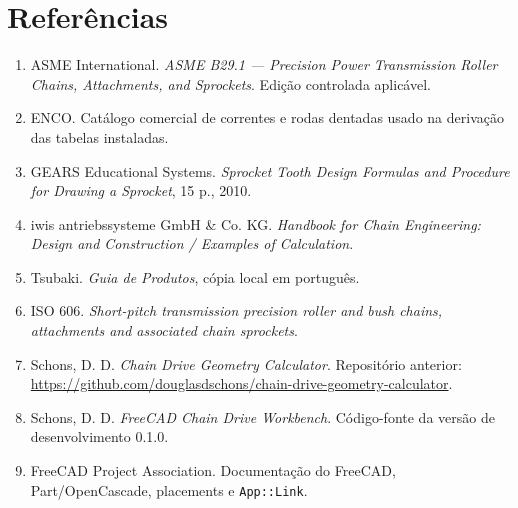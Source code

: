 \documentclass[11pt]{article}
\newcommand{\codigo}[1]{\texttt{#1}}
\begin{document}
\section{Referências}
\begin{enumerate}
\item ASME International. \emph{ASME B29.1 --- Precision Power Transmission Roller Chains, Attachments, and Sprockets}. Edição controlada aplicável.
\item ENCO. Catálogo comercial de correntes e rodas dentadas usado na derivação das tabelas instaladas.
\item GEARS Educational Systems. \emph{Sprocket Tooth Design Formulas and Procedure for Drawing a Sprocket}, 15 p., 2010.
\item iwis antriebssysteme GmbH \& Co. KG. \emph{Handbook for Chain Engineering: Design and Construction / Examples of Calculation}.
\item Tsubaki. \emph{Guia de Produtos}, cópia local em português.
\item ISO 606. \emph{Short-pitch transmission precision roller and bush chains, attachments and associated chain sprockets}.
\item Schons, D. D. \emph{Chain Drive Geometry Calculator}. Repositório anterior: \url{https://github.com/douglasdschons/chain-drive-geometry-calculator}.
\item Schons, D. D. \emph{FreeCAD Chain Drive Workbench}. Código-fonte da versão de desenvolvimento 0.1.0.
\item FreeCAD Project Association. Documentação do FreeCAD, Part/OpenCascade, placements e \codigo{App::Link}.
\end{enumerate}
\end{document}
